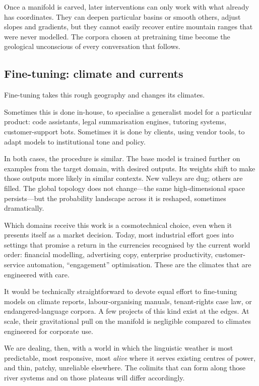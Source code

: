 \documentclass[12pt,a4paper]{article}
\begin{document}
Once a manifold is carved, later interventions can only work with what already has coordinates. They can deepen particular basins or smooth others, adjust slopes and gradients, but they cannot easily recover entire mountain ranges that were never modelled. The corpora chosen at pretraining time become the geological unconscious of every conversation that follows.

\subsection{Fine-tuning: climate and currents}

Fine-tuning takes this rough geography and changes its climates.

Sometimes this is done in-house, to specialise a generalist model for a particular product: code assistants, legal summarisation engines, tutoring systems, customer-support bots. Sometimes it is done by clients, using vendor tools, to adapt models to institutional tone and policy.

In both cases, the procedure is similar. The base model is trained further on examples from the target domain, with desired outputs. Its weights shift to make those outputs more likely in similar contexts. New valleys are dug; others are filled. The global topology does not change---the same high-dimensional space persists---but the probability landscape across it is reshaped, sometimes dramatically.

Which domains receive this work is a cosmotechnical choice, even when it presents itself as a market decision. Today, most industrial effort goes into settings that promise a return in the currencies recognised by the current world order: financial modelling, advertising copy, enterprise productivity, customer-service automation, ``engagement'' optimisation. These are the climates that are engineered with care.

It would be technically straightforward to devote equal effort to fine-tuning models on climate reports, labour-organising manuals, tenant-rights case law, or endangered-language corpora. A few projects of this kind exist at the edges. At scale, their gravitational pull on the manifold is negligible compared to climates engineered for corporate use.

We are dealing, then, with a world in which the linguistic weather is most predictable, most responsive, most \emph{alive} where it serves existing centres of power, and thin, patchy, unreliable elsewhere. The colimits that can form along those river systems and on those plateaus will differ accordingly.
\end{document}
